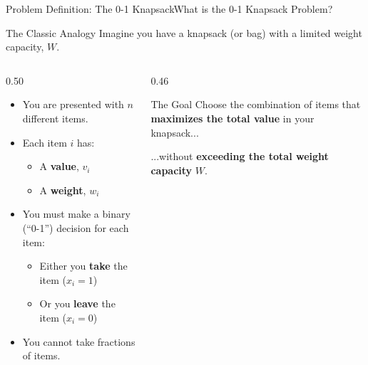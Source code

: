 \documentclass[aspectratio=169]{beamer}
\begin{document}
\begin{frame}{Problem Definition: The 0-1 Knapsack}{What is the 0-1 Knapsack Problem?}
    \begin{block}{The Classic Analogy}
        Imagine you have a knapsack (or bag) with a limited weight capacity, $W$.
    \end{block}

    \begin{columns}[T]
        \begin{column}{0.50\textwidth}
            \begin{itemize}
                \item You are presented with $n$ different items.
                \item Each item $i$ has:
                \begin{itemize}
                    \item A \textbf{value}, $v_i$
                    \item A \textbf{weight}, $w_i$
                \end{itemize}
                \item You must make a binary (``0-1'') decision for each item:
                \begin{itemize}
                    \item Either you \textbf{take} the item ($x_i = 1$)
                    \item Or you \textbf{leave} the item ($x_i = 0$)
                \end{itemize}
                \item You cannot take fractions of items.
            \end{itemize}
        \end{column}
        \begin{column}{0.46\textwidth}
            \begin{alertblock}{The Goal}
                \centering
                Choose the combination of items that \textbf{maximizes the total value} in your knapsack...
                \vspace{0.8em}

                ...without \textbf{exceeding the total weight capacity} $W$.
            \end{alertblock}
        \end{column}
    \end{columns}
\end{frame}
\end{document}
